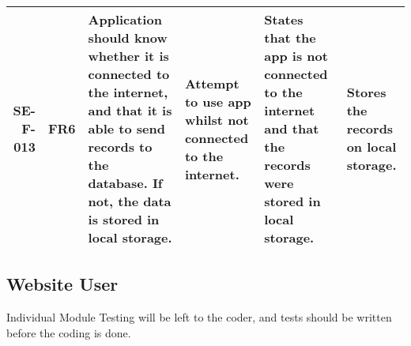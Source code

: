 \begin{landscape}
\begin{longtable}{|r|l|p{4cm}|p{4cm}|p{4cm}|p{4cm}|}
		SE-F-013 & FR6 & Application should know whether it is connected to the internet, and that it is able to send records to the database. If not, the data is stored in local storage. & Attempt to use app whilst not connected to the internet. &  States that the app is not connected to the internet and that the records were stored in local storage. & Stores the records on local storage. \\ \hline
		\end{longtable}	
	\end{landscape}

\subsection{Website User}
	Individual Module Testing will be left to the coder, and tests should be written before the coding is done.

